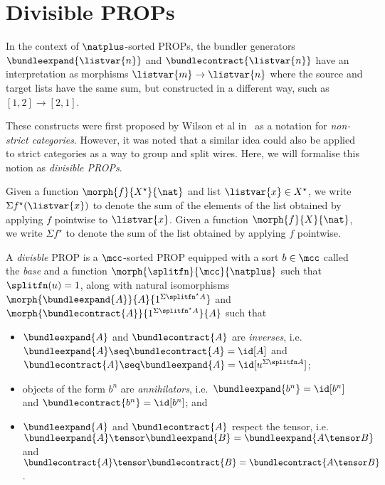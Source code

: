 \section{Divisible PROPs}

In the context of \(\natplus\)-sorted PROPs, the bundler generators
\(\bundleexpand{\listvar{n}}\) and \(\bundlecontract{\listvar{n}}\) have an
interpretation as morphisms
\(\listvar{m} \to \listvar{n}\) where the source and target lists have the
same sum, but constructed in a different way, such as \([1,2] \to [2,1]\).


These constructs were first proposed by Wilson et al in~\cite{wilson2023string}
as a notation for \emph{non-strict categories}.
However, it was noted that a similar idea could also be applied to strict
categories as a way to group and split wires.
Here, we will formalise this notion as \emph{divisible PROPs}.

\begin{notation}
    Given a function \(\morph{f}{X^\star}{\nat}\) and list
    \(\listvar{x} \in X^\star\), we write \(\Sigma{f^\star(\listvar{x})}\) to
    denote the sum of the elements of the list obtained by applying \(f\)
    pointwise to \(\listvar{x}\).
    Given a function \(\morph{f}{X}{\nat}\), we write \(\Sigma f^\star\) to
    denote the sum of the list obtained by applying \(f\) pointwise.
\end{notation}

\begin{definition}
    A \emph{divisble} PROP is a \(\mcc\)-sorted PROP equipped
    with a sort \(b \in \mcc\) called the \emph{base} and a function \(
        \morph{\splitfn}{\mcc}{\natplus}
    \) such that \(\splitfn(u) = 1\), along with natural isomorphisms \(
        \morph{\bundleexpand{A}}{A}{1^{\Sigma\splitfn^\star{A}}}
    \) and \(
        \morph{\bundlecontract{A}}{1^{\Sigma\splitfn^\star{A}}}{A}
    \) such that
    \begin{itemize}
        \item \(\bundleexpand{A}\) and \(\bundlecontract{A}\)
                are \emph{inverses}, i.e.\ \(
                    \bundleexpand{A} \seq \bundlecontract{A} = \id[A]
                \) and \(
                    \bundlecontract{A} \seq \bundleexpand{A} = \id[u^{\Sigma\splitfn A}]
                \);
        \item objects of the form \(b^{n}\) are \emph{annihilators},
                i.e.\ \(
                    \bundleexpand{b^n} = \id[b^n]
                \) and \(
                    \bundlecontract{b^n} = \id[b^n]
                \); and
        \item \(\bundleexpand{A}\) and \(\bundlecontract{A}\) respect the
                tensor, i.e.\ \(
                    \bundleexpand{A} \tensor \bundleexpand{B}
                    =
                    \bundleexpand{A \tensor B}
                \) and \(
                    \bundlecontract{A} \tensor \bundlecontract{B}
                    =
                    \bundlecontract{A \tensor B}
                \).
    \end{itemize}
\end{definition}

